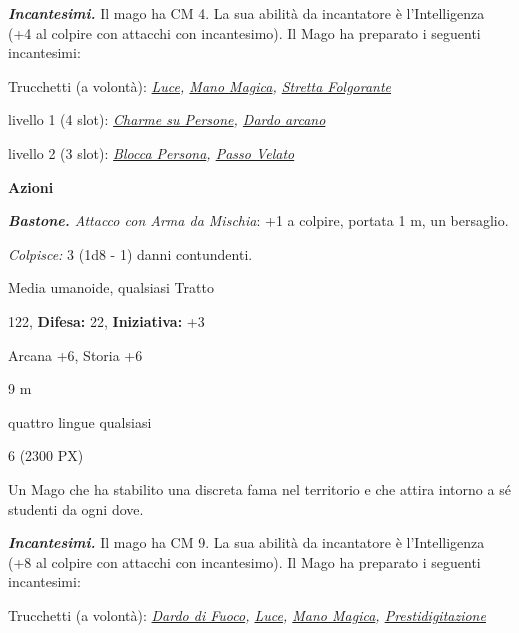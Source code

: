 \begin{multicols}{2}
{\emph{\textbf{Incantesimi.}} Il mago ha CM 4. La sua abilità da incantatore è l'Intelligenza (+4 al colpire con attacchi con incantesimo). Il Mago ha preparato i seguenti incantesimi:

Trucchetti (a volontà): \emph{\hyperlink{Luce}{Luce}, \hyperlink{Mano Magica}{Mano Magica}, \hyperlink{Stretta Folgorante}{Stretta Folgorante}}

livello 1 (4 slot): \emph{\hyperlink{Charme su Persone}{Charme su Persone},  \hyperlink{Dardo arcano}{Dardo arcano}}

livello 2 (3 slot): \emph{\hyperlink{Blocca Persona}{Blocca Persona}, \hyperlink{Passo Velato}{Passo Velato}}

\textbf{Azioni}

\emph{\textbf{Bastone.} Attacco con Arma da Mischia}: +1 a colpire, portata 1 m, un bersaglio.

\emph{Colpisce:} 3 (1d8 - 1) danni contundenti.

\begin{description}[noitemsep, topsep=0pt, parsep=0pt, partopsep=0pt, leftmargin=0cm, labelwidth=2.2cm]
    \item[\textbf{Taglia/Tipo:}] Media umanoide, qualsiasi Tratto
    \item[\textbf{Caratt.:}] 
    \item[\textbf{Punti Ferita:}] 122,  \textbf{Difesa:} 22,  \textbf{Iniziativa:} +3
    \item[\textbf{Comp.:}] Arcana +6, Storia +6
    \item[\textbf{Tiri Salvez.:}] 
    \item[\textbf{Movimento:}] 9 m
    \item[\textbf{Linguaggi:}] quattro lingue qualsiasi
    \item[\textbf{Sfida:}] 6 (2300 PX)\smallskip
\end{description}

Un Mago che ha stabilito una discreta fama nel territorio e che attira intorno a sé studenti da ogni dove.

\emph{\textbf{Incantesimi.}} Il mago ha CM 9. La sua abilità da incantatore è l'Intelligenza (+8 al colpire con attacchi con incantesimo). Il Mago ha preparato i seguenti incantesimi:

Trucchetti (a volontà): \emph{\hyperlink{Dardo di Fuoco}{Dardo di Fuoco}, \hyperlink{Luce}{Luce}, \hyperlink{Mano Magica}{Mano Magica}, \hyperlink{Prestidigitazione}{Prestidigitazione}}

}
\end{multicols}
